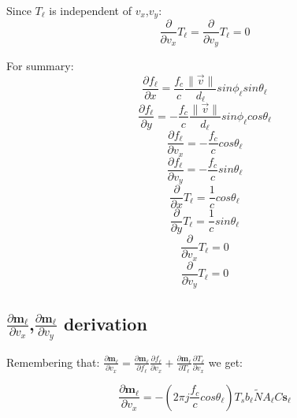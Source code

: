\documentclass[10pt,a4paper]{report}
\begin{document}
Since $T_\ell $ is independent of $v_x$,$v_y$:
\begin{equation}
\frac{\partial}{\partial v_x}  T_\ell =\frac{\partial}{\partial v_y}  T_\ell =0
\end{equation}

For summary:
\begin{equation}
\frac{\partial f_\ell }{\partial x}=\frac{f_c}{c} \frac{\|\vec{v}\|}{d_\ell } sin\phi_\ell  sin\theta_\ell 
\end{equation}
\begin{equation}
\frac{\partial f_\ell }{\partial y}=-\frac{f_c}{c}  \frac{\|\vec{v}\|}{d_\ell }  sin\phi_\ell  cos\theta_\ell 
\end{equation}
\begin{equation}
\frac{\partial f_\ell }{\partial v_x}=-\frac{f_c}{c} cos\theta_\ell 
\end{equation}
\begin{equation}
\frac{\partial f_\ell }{\partial v_y}=-\frac{f_c}{c} sin\theta_\ell 
\end{equation}
\begin{equation}
\frac{\partial}{\partial x} T_\ell =\frac{1}{c} cos\theta_\ell 
\end{equation}
\begin{equation}
\frac{\partial}{\partial y} T_\ell =\frac{1}{c} sin\theta_\ell 
\end{equation}
\begin{equation}
\frac{\partial}{\partial v_x}  T_\ell =0
\end{equation}
\begin{equation}
\frac{\partial}{\partial v_y}  T_\ell =0
\end{equation}

\subsection{$\frac{\partial \mathbf{m_\ell }}{\partial v_x}$,$\frac{\partial \mathbf{m_\ell }}{\partial v_y}$ derivation}

Remembering that:
$\frac{\partial \mathbf{m_\ell }}{\partial v_x} = \frac{\partial \mathbf{m_\ell }}{\partial f_\ell }\frac{\partial f_\ell }{\partial v_x} + \frac{\partial \mathbf{m_\ell }}{\partial T_\ell }\frac{\partial T_\ell }{\partial v_x}$
we get:

\begin{equation}
\frac{\partial \mathbf{m_\ell }}{\partial v_x} = -(2 \pi j \frac{f_c}{c} cos\theta_\ell ) T_s b_\ell  \tilde{N} A_\ell  C \mathbf{s_\ell }
\end{equation}
\end{document}
